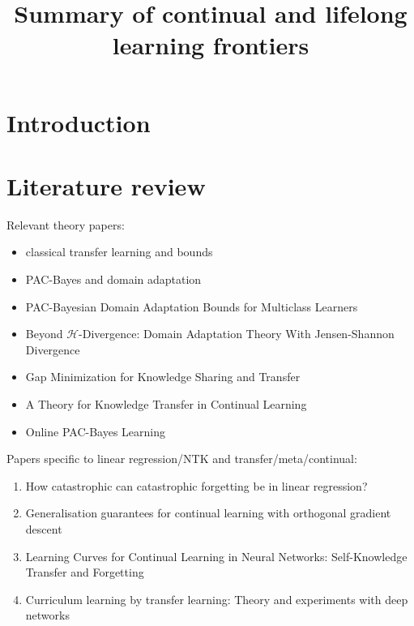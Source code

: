 \documentclass[letterpaper]{article}
\title{Summary of continual and lifelong learning frontiers}
\theoremstyle{definition}
\begin{document}
	
	\maketitle
	
	
\section{Introduction}
	

\section{Literature review}

Relevant theory papers:

\begin{itemize}
	\item classical transfer learning and bounds
	\item PAC-Bayes and domain adaptation \citep{germain2020pac}
	\item PAC-Bayesian Domain Adaptation Bounds for Multiclass Learners \citep{sicilia2022pac}
	\item Beyond $\mathcal{H}$-Divergence: Domain Adaptation Theory With Jensen-Shannon Divergence \citep{shui2020beyond}
	\item Gap Minimization for Knowledge Sharing and Transfer \citep{wang2022gap}
	\item A Theory for Knowledge Transfer in Continual Learning \citep{benavides2022theory}
	\item Online PAC-Bayes Learning \citep{haddouche2022online}
\end{itemize}

Papers specific to linear regression/NTK and transfer/meta/continual:
\begin{enumerate}
	\item How catastrophic can catastrophic forgetting be in linear regression? \citep{evron2022catastrophic}
	\item Generalisation guarantees for continual learning with orthogonal gradient descent \citep{bennani2020generalisation}
	\item  Learning Curves for Continual Learning in Neural Networks: Self-Knowledge Transfer and Forgetting \citep{karakida2021learning}
	\item Curriculum learning by transfer learning: Theory and experiments with deep networks \citep{weinshall2018curriculum}
\end{enumerate}
\end{document}
